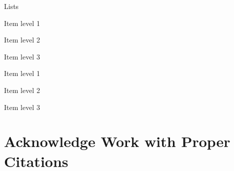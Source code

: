 \documentclass[aspectratio=169]{beamer}
\begin{document}
\begin{frame}{Lists}
\begin{minipage}[t]{0.49\textwidth}
    \end{minipage}
    \hfill
    \begin{minipage}[t]{0.49\textwidth}
        \begin{coloredblock}
            \vspace{0.5cm}
            \begin{tugitemize}
                \item Item level 1
                \begin{tugitemize}
                    \item Item level 2
                    \begin{tugitemize}
                        \item Item level 3
                    \end{tugitemize}
                \end{tugitemize}
            \end{tugitemize}
        \end{coloredblock}

        \begin{coloredblock}
                \begin{boxenumerate}
                    \item Item level 1
                    \begin{boxenumerate}
                        \item Item level 2
                        \begin{boxenumerate}
                            \item Item level 3
                        \end{boxenumerate}
                    \end{boxenumerate}
                \end{boxenumerate}
        \end{coloredblock}
    \end{minipage}
\end{frame}


\section{\textbf{Acknowledge} Work with Proper \textbf{Citations}}
\end{document}
